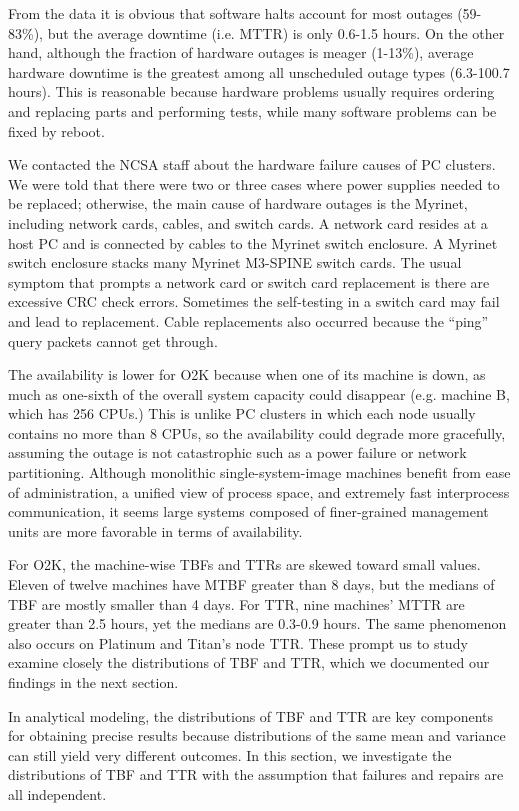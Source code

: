 \documentclass[10pt,twocolumn]{article}
\begin{document}
From the data it is obvious that software halts account for most 
outages (59-83\%), but the average downtime (i.e. MTTR) is only 
0.6-1.5 hours. On the other hand, although the fraction of hardware 
outages is meager (1-13\%), average hardware downtime is 
the greatest among all unscheduled outage types (6.3-100.7 hours). 
This is reasonable because hardware problems usually 
requires ordering and replacing parts and performing tests, while
many software problems can be fixed by reboot.

We contacted the NCSA staff about the hardware failure causes of
PC clusters.
We were told that there were two or three cases where power supplies
needed to be replaced; otherwise, the main cause of hardware
outages is the Myrinet, including network cards, cables, and switch cards.
A network card resides at a host PC and is connected by cables to
the Myrinet switch enclosure. A Myrinet switch enclosure stacks
many Myrinet M3-SPINE switch cards. The usual symptom that prompts a
network card or switch card replacement is there are excessive CRC 
check errors. Sometimes the self-testing in a switch card may fail 
and lead to replacement. Cable replacements also occurred because 
the ``ping'' query packets cannot get through. 

The availability is lower for O2K because when one of its machine 
is down, as much as one-sixth of the overall system capacity could 
disappear (e.g. machine B, which has 256 CPUs.) This is unlike PC 
clusters in which each node usually contains no more than 8 CPUs, 
so the availability could degrade more gracefully, assuming the 
outage is not catastrophic such as a power failure or network 
partitioning. Although monolithic single-system-image machines 
benefit from ease of administration, a unified view of process 
space, and extremely fast interprocess communication, it seems 
large systems composed of finer-grained management units are more 
favorable in terms of availability.

For O2K, the machine-wise TBFs and TTRs are skewed toward small 
values. Eleven of twelve machines have MTBF 
greater than 8 days, but the medians of TBF are mostly smaller than
 4 days. For TTR, nine machines' MTTR are greater than 2.5 hours, yet 
the medians are 0.3-0.9 hours. The same phenomenon also occurs 
on Platinum and Titan's node TTR. These prompt us to study 
examine closely the distributions of TBF and TTR, which we
documented our findings in the next section.

\label{s:dist}
In analytical modeling, the distributions of TBF and TTR
are key components for obtaining precise results \cite{TrivediBook} 
because distributions of the same mean and variance can still 
yield very different outcomes. In this section, we investigate the 
distributions of TBF and TTR with the assumption that 
failures and repairs are all independent.
\end{document}
